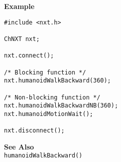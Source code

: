 \noindent
{\bf Example}
\begin{verbatim}
#include <nxt.h>

ChNXT nxt;

nxt.connect();

/* Blocking function */
nxt.humanoidWalkBackward(360);

/* Non-blocking function */
nxt.humanoidWalkBackwardNB(360);
nxt.humanoidMotionWait();

nxt.disconnect();
\end{verbatim}

\noindent
{\bf See Also}\\
\texttt{humanoidWalkBackward()}


